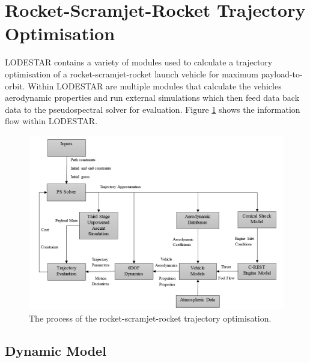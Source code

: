\section{Rocket-Scramjet-Rocket Trajectory Optimisation}


LODESTAR contains a variety of modules used to calculate a trajectory optimisation of a rocket-scramjet-rocket launch vehicle for maximum payload-to-orbit. 
Within LODESTAR are multiple modules that calculate the vehicles aerodynamic properties and run external simulations which then feed data back data to the pseudospectral solver for evaluation. 
Figure \ref{fig:AscentFlowchart} shows the information flow within LODESTAR. 

\begin{landscape}%
	\begin{figure}[ht]
		\centering
		\includegraphics[width=0.9\linewidth]{"figures/4_LODESTAR/Ascent Flowchart"}
		\caption{The process of the rocket-scramjet-rocket trajectory optimisation.}
		\label{fig:AscentFlowchart}
	\end{figure} 
\end{landscape}


\subsection{Dynamic Model}


